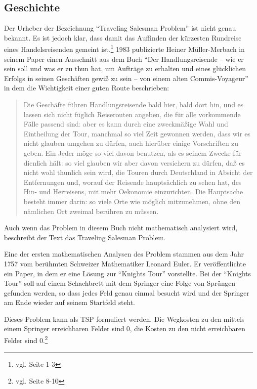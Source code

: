 \documentclass[a4paper]{article}
\begin{document}
\subsection{Geschichte}
Der Urheber der Bezeichnung "`Traveling Salesman Problem"' ist nicht genau bekannt. Es ist jedoch klar, dass damit das Auffinden der kürzesten Rundreise eines Handelsreisenden gemeint ist.\footnote{vgl. \cite{applegate06} Seite 1-3} 1983 publizierte Heiner Müller-Merbach in seinem Paper\cite{mueller83} einen Ausschnitt aus dem Buch "`Der Handlungsreisende – wie er sein soll und was er zu thun hat, um Aufträge zu erhalten und eines glücklichen Erfolgs in seinen Geschäften gewiß zu sein – von einem alten Commis-Voyageur"' in dem die Wichtigkeit einer guten Route beschrieben:  
\begin{quotation}
Die Geschäfte führen Handlungsreisende bald hier, bald dort hin, und es lassen sich nicht füglich Reiserouten angeben, die für alle vorkommende Fälle passend sind: aber es kann durch eine zweckmäßige Wahl und Eintheilung der Tour, manchmal so viel Zeit gewonnen werden, dass wir es nicht glauben umgehen zu dürfen, auch hierüber einige Vorschriften zu geben. Ein Jeder möge so viel davon benutzen, als es seinem Zwecke für dienlich hält: so viel glauben wir aber davon versichern zu dürfen, daß es nicht wohl thunlich sein wird, die Touren durch Deutschland in Absicht der Entfernungen und, worauf der Reisende hauptsächlich zu sehen hat, des Hin- und Herreisens, mit mehr Oekonomie einzurichten. Die Hauptsache besteht immer darin: so viele Orte wie möglich mitzunehmen, ohne den nämlichen Ort zweimal berühren zu müssen.
\end{quotation}

Auch wenn das Problem in diesem Buch nicht mathematisch analysiert wird, beschreibt der Text das Traveling Salesman Problem. 

Eine der ersten mathematischen Analysen des Problem stammen aus dem Jahr 1757 vom berühmten Schweizer Mathematiker Leonard Euler. Er veröffentlichte ein Paper, in dem er eine Lösung zur "`Knights Tour"' vorstellte. Bei der "`Knights Tour"' soll auf einem Schachbrett mit dem Springer eine Folge von Sprüngen gefunden werden, so dass jedes Feld genau einmal besucht wird und der Springer am Ende wieder auf seinem Startfeld steht.

Dieses Problem kann als TSP formuliert werden. Die Wegkosten zu den mittels einem Springer erreichbaren Felder sind 0, die Kosten zu den nicht erreichbaren Felder sind 0.\footnote{vgl. \cite{applegate06} Seite 8-10}
\end{document}
